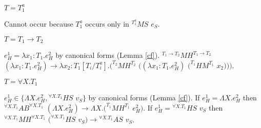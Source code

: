 \begin{case}
\begin{subcase}
$T=T_{1}^{a}$

Cannot occur because $T_{1}^{a}$ occurs only in $^{T_{1}^{a}}MS$ $e_{S}$.

\end{subcase}

\begin{subcase}

$T=T_{1}\rightarrow T_{2}$

$e_{H}^{1}=\lambda x_{1}:T_{1}.e_{H}^{2}$ by canonical forms (Lemma \ref{cf}).  $^{T_{1}\rightarrow T_{2}}MH^{T_{1}\rightarrow T_{2}}$ $(\lambda x_{1}:T_{1}.e_{H}^{2})\rightarrow\lambda x_{2}:T_{1}[T_{i}/T^{a}_{i}].(^{T_{2}}MH^{T_{2}}$ $((\lambda x_{1}:T_{1}.e_{H}^{2})$ $(^{T_{1}}HM^{T_{1}}$ $x_{2})))$.

\end{subcase}

\begin{subcase}

$T=\forall X.T_{1}$

$e_{H}^{1}\in\lbrace\Lambda X.e_{H}^{2},{^{\forall X.T_{1}}H}S$ $v_{S}\rbrace$ by canonical forms (Lemma \ref{cf}).  If $e_{H}^{1}=\Lambda X.e_{H}^{2}$ then $^{\forall X.T_{1}}AB^{\forall X.T_{1}}$ $(\Lambda X.e_{H}^{2})\rightarrow\Lambda X.(^{T_{1}}MH^{T_{1}}$ $e_{H}^{2})$.  If $e_{H}^{1}={^{\forall X.T_{1}}H}S$ $v_{S}$ then $^{\forall X.T_{1}}MH^{\forall X.T_{1}}$ $(^{\forall X.T_{1}}HS$ $v_{S})\rightarrow{^{\forall X.T_{1}}A}S$ $v_{S}$.

\end{subcase}

\end{case}